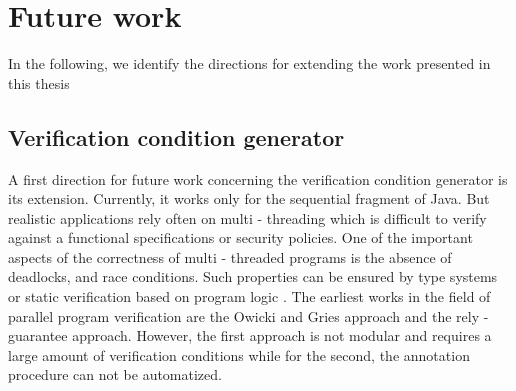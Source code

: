 \section{Future work}
In the following, we identify the directions for extending the work presented in this thesis

\subsection{ Verification condition generator}
A first direction for future work concerning the verification condition generator is its extension.
Currently, it works only for the sequential fragment of Java. But realistic applications 
rely often on multi - threading which is difficult to verify against a functional specifications or security policies.
One of the important aspects of the correctness of multi - threaded programs is the absence of deadlocks, 
and race conditions. Such properties can be ensured  by type systems \cite{FA99TSL,flanagan00typebased} or static verification based on program logic \cite{FLL02ESC}.  
The earliest works in the field of parallel program  verification are
  the Owicki and Gries approach   
\cite{nipkow99owickigries}  and the rely - guarantee approach. However, 
the first approach is not modular and requires a large amount of verification conditions while for the second, the annotation procedure can not be automatized.

